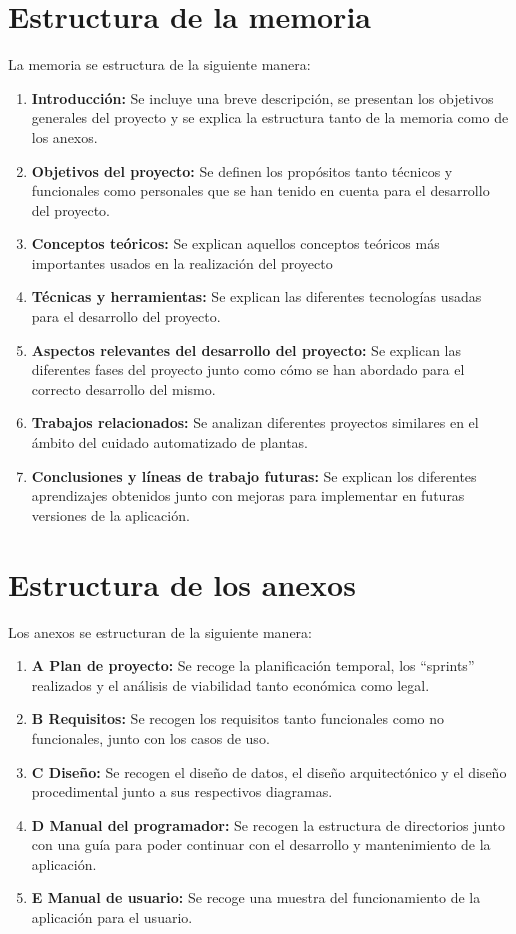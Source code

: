 \section{Estructura de la memoria}
La memoria se estructura de la siguiente manera:
\begin{enumerate}
    \item \textbf{Introducción:} Se incluye una breve descripción, se presentan los objetivos generales del proyecto y se explica la estructura tanto de la memoria como de los anexos.
    \item \textbf{Objetivos del proyecto:} Se definen los propósitos tanto técnicos y funcionales como personales que se han tenido en cuenta para el desarrollo del proyecto.
    \item \textbf{Conceptos teóricos:} Se explican aquellos conceptos teóricos más importantes usados en la realización del proyecto
    \item \textbf{Técnicas y herramientas:} Se explican las diferentes tecnologías usadas para el desarrollo del proyecto.
    \item \textbf{Aspectos relevantes del desarrollo del proyecto:} Se explican las diferentes fases del proyecto junto como cómo se han abordado para el correcto desarrollo del mismo.
    \item \textbf{Trabajos relacionados:} Se analizan diferentes proyectos similares en el ámbito del cuidado automatizado de plantas.
    \item \textbf{Conclusiones y líneas de trabajo futuras:} Se explican los diferentes aprendizajes obtenidos junto con mejoras para implementar en futuras versiones de la aplicación.
\end{enumerate}

\section{Estructura de los anexos}
Los anexos se estructuran de la siguiente manera:
\begin{enumerate}
    \item \textbf{A Plan de proyecto:} Se recoge la planificación temporal, los ``sprints'' realizados y el análisis de viabilidad tanto económica como legal.
    \item \textbf{B Requisitos:} Se recogen los requisitos tanto funcionales como no funcionales, junto con los casos de uso.
    \item \textbf{C Diseño:} Se recogen el diseño de datos, el diseño arquitectónico y el diseño procedimental junto a sus respectivos diagramas.
    \item \textbf{D Manual del programador:} Se recogen la estructura de directorios junto con una guía para poder continuar con el desarrollo y mantenimiento de la aplicación.
    \item \textbf{E Manual de usuario:} Se recoge una muestra del funcionamiento de la aplicación para el usuario.
\end{enumerate}